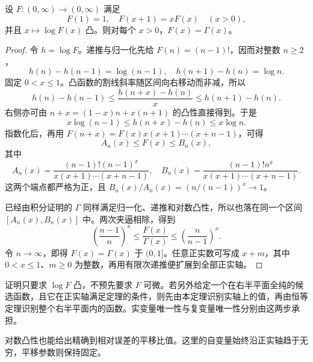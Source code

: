 \begin{theorem}\label{b3:thm:21-bohr-mollerup}
设 \(F:(0,\infty)\to(0,\infty)\) 满足
\[
 F(1)=1,\quad F(x+1)=xF(x)\quad(x>0),
\]
并且 \(x\mapsto\log F(x)\) 凸。则对每个 \(x>0\)，\(F(x)=\Gamma(x)\)。
\end{theorem}
\begin{proof}
令 \(h=\log F\)。递推与归一化先给 \(F(n)=(n-1)!\)，因而对整数 \(n\ge2\)，
\[
 h(n)-h(n-1)=\log(n-1),\quad
 h(n+1)-h(n)=\log n.
\]
固定 \(0<x\le1\)。凸函数的割线斜率随区间向右移动而非减，所以
\[
 h(n)-h(n-1)
 \le\frac{h(n+x)-h(n)}x
 \le h(n+1)-h(n).
\]
右侧亦可由 \(n+x=(1-x)n+x(n+1)\) 的凸性直接得到。于是
\[
 x\log(n-1)\le h(n+x)-h(n)\le x\log n.
\]
指数化后，再用 \(F(n+x)=F(x)x(x+1)\cdots(x+n-1)\)，可得
\[
 A_n(x)\le F(x)\le B_n(x),
\]
其中
\[
 A_n(x)=\frac{(n-1)!(n-1)^x}{x(x+1)\cdots(x+n-1)},\quad
 B_n(x)=\frac{(n-1)!n^x}{x(x+1)\cdots(x+n-1)}.
\]
这两个端点都严格为正，且 \(B_n(x)/A_n(x)=(n/(n-1))^x\to1\)。

已经由积分证明的 \(\Gamma\) 同样满足归一化、递推和对数凸性，所以也落在同一个区间 \([A_n(x),B_n(x)]\) 中。两次夹逼相除，得到
\[
 \left(\frac{n-1}{n}\right)^x
 \le\frac{F(x)}{\Gamma(x)}
 \le\left(\frac n{n-1}\right)^x.
\]
令 \(n\to\infty\)，即得 \(F(x)=\Gamma(x)\) 于 \((0,1]\)。任意正实数可写成 \(x+m\)，其中 \(0<x\le1\)、\(m\ge0\) 为整数，再用有限次递推便扩展到全部正实轴。
\end{proof}
证明只要求 \(\log F\) 凸，不预先要求 \(F\) 可微。若另外给定一个在右半平面全纯的候选函数，且它在正实轴满足定理的条件，则先由本定理识别实轴上的值，再由恒等定理识别整个右半平面内的函数。实变量唯一性与复变量唯一性分别由这两步承担。

\ProseParagraphBreak

对数凸性也能给出精确到相对误差的平移比值。这里的自变量始终沿正实轴趋于无穷，平移参数则保持固定。

